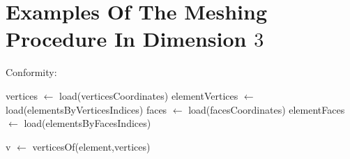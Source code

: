 \section{Examples Of The Meshing Procedure In Dimension $3$} %
\label{auxlabel211}
\tauZero
\newpage
{}
\newpage
\tauOneEnCube
\tauOneEn
\newpage
Conformity:
\conform

\begin{algorithm}
	\begin{algorithmic}
		\State vertices $\leftarrow$ load(verticesCoordinates)
		\State elementVertices $\leftarrow$ load(elementsByVerticesIndices)
		\State faces $\leftarrow$ load(facesCoordinates)
		\State elementFaces $\leftarrow$ load(elementsByFacesIndices)

			\State v $\gets$ verticesOf(element,vertices)
		\EndFor
	\end{algorithmic}
\end{algorithm}
